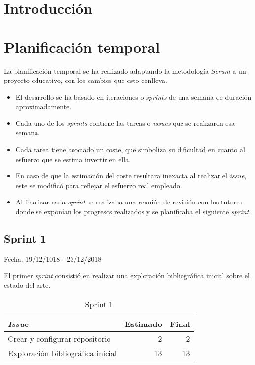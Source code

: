 
\section{Introducción}

\section{Planificación temporal}

La planificación temporal se ha realizado adaptando la metodología \textit{Scrum} a un proyecto educativo, con los cambios que esto conlleva.

\begin{itemize}
	\item El desarrollo se ha basado en iteraciones o \textit{sprints} de una semana de duración aproximadamente.
	\item  Cada uno de los \textit{sprints} contiene las tareas o \textit{issues} que se realizaron esa semana. 
	\item Cada tarea tiene asociado un coste, que simboliza su dificultad en cuanto al esfuerzo que se estima invertir en ella.
	\item En caso de que la estimación del coste resultara inexacta al realizar el \textit{issue}, este se modificó para reflejar el esfuerzo real empleado.
	\item Al finalizar cada \textit{sprint} se realizaba una reunión de revisión con los tutores donde se exponían los progresos realizados y se planificaba el siguiente \textit{sprint}.
\end{itemize}

\subsection{Sprint 1}

Fecha: 19/12/1018 - 23/12/2018

El primer \textit{sprint} consistió en realizar una exploración bibliográfica inicial sobre el estado del arte. 

\begin{table}[H]
	 \begin{tabularx}{\linewidth}{X r r}
	 	\toprule \textbf{\textit{Issue}} & \textbf{Estimado} & \textbf{Final}\\
	 	\toprule
	 	Crear y configurar repositorio & 2 & 2 \\
	 	Exploración bibliográfica inicial & 13 & 13 \\
	 	\bottomrule
	 \end{tabularx}
	 \caption{Sprint 1}
\end{table}

